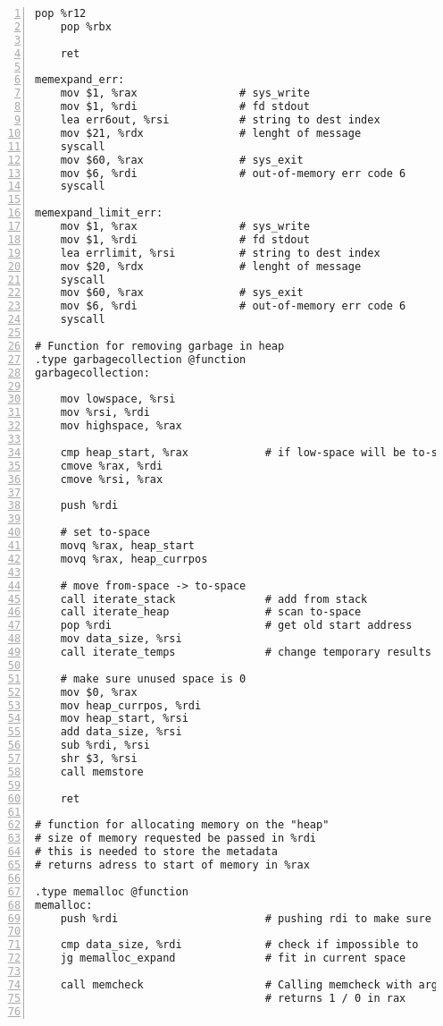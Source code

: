 \documentclass{article}
\begin{document}
\begin{lstlisting}[numbers=left, firstnumber=1]
    pop %r12
    pop %rbx
    
	ret

memexpand_err:
	mov $1, %rax 			    # sys_write
	mov $1, %rdi			    # fd stdout
	lea err6out, %rsi		    # string to dest index
	mov $21, %rdx			    # lenght of message 
	syscall 
	mov $60, %rax			    # sys_exit
	mov $6, %rdi 			    # out-of-memory err code 6
	syscall
    
memexpand_limit_err:
	mov $1, %rax 			    # sys_write
	mov $1, %rdi			    # fd stdout
	lea errlimit, %rsi		    # string to dest index
	mov $20, %rdx			    # lenght of message 
	syscall 
	mov $60, %rax			    # sys_exit
	mov $6, %rdi 			    # out-of-memory err code 6
	syscall

# Function for removing garbage in heap
.type garbagecollection @function
garbagecollection: 

    mov lowspace, %rsi
    mov %rsi, %rdi
    mov highspace, %rax
    
    cmp heap_start, %rax            # if low-space will be to-space, swap
    cmove %rax, %rdi
    cmove %rsi, %rax
    
    push %rdi
    
    # set to-space
    movq %rax, heap_start
    movq %rax, heap_currpos
    
    # move from-space -> to-space
    call iterate_stack              # add from stack
    call iterate_heap               # scan to-space
    pop %rdi                        # get old start address
    mov data_size, %rsi
    call iterate_temps              # change temporary results
        
    # make sure unused space is 0
    mov $0, %rax
    mov heap_currpos, %rdi
    mov heap_start, %rsi
    add data_size, %rsi
    sub %rdi, %rsi 
    shr $3, %rsi
    call memstore
    
    ret    

# function for allocating memory on the "heap"
# size of memory requested be passed in %rdi
# this is needed to store the metadata
# returns adress to start of memory in %rax

.type memalloc @function
memalloc: 
	push %rdi						# pushing rdi to make sure value is unmodified
    
    cmp data_size, %rdi             # check if impossible to
    jg memalloc_expand              # fit in current space
    
	call memcheck          			# Calling memcheck with argument in %rdi 
									# returns 1 / 0 in rax 


\end{lstlisting}
\end{document}

